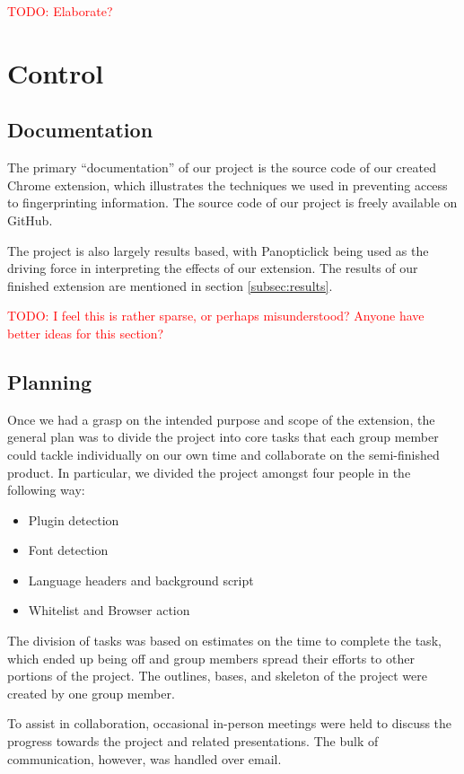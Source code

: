 \documentclass[12pt,a4paper]{article}
\begin{document}
\textcolor{red}{TODO: Elaborate?}

\section{Control}
\subsection{Documentation}
The primary ``documentation'' of our project is the source code of our created Chrome extension, which illustrates the techniques we used in preventing access to fingerprinting information. The source code of our project is freely available on GitHub\cite{github}.

The project is also largely results based, with Panopticlick being used as the driving force in interpreting the effects of our extension. The results of our finished extension are mentioned in section \ref{subsec:results}.

\textcolor{red}{TODO: I feel this is rather sparse, or perhaps misunderstood? Anyone have better ideas for this section?}

\subsection{Planning}
Once we had a grasp on the intended purpose and scope of the extension, the general plan was to divide the project into core tasks that each group member could tackle individually on our own time and collaborate on the semi-finished product. In particular, we divided the project amongst four people in the following way:

\begin{itemize}
	\item Plugin detection
	\item Font detection
	\item Language headers and background script
	\item Whitelist and Browser action
\end{itemize}

The division of tasks was based on estimates on the time to complete the task, which ended up being off and group members spread their efforts to other portions of the project. The outlines, bases, and skeleton of the project were created by one group member.

To assist in collaboration, occasional in-person meetings were held to discuss the progress towards the project and related presentations. The bulk of communication, however, was handled over email.
\end{document}
